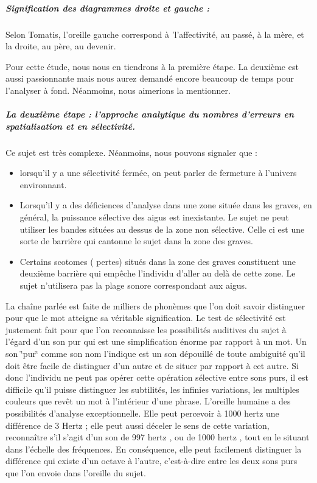 {\subparagraph{Signification des diagrammes droite et gauche : }

Selon Tomatis, l'oreille gauche correspond à \textquoteright l'affectivité,
au passé, à la mère, et la droite, au père, au devenir.

Pour cette étude, nous nous en tiendrons à la première étape. La deuxième est aussi passionnante mais nous aurez demandé encore beaucoup de temps pour l'analyser à fond. Néanmoins, nous aimerions la mentionner.

\subparagraph{La deuxième étape : l'approche analytique du nombres d'erreurs en
spatialisation et en sélectivité.}


Ce sujet est très complexe. Néanmoins, nous pouvons signaler que : 
\begin{itemize}
\item lorsqu'il y a une sélectivité fermée, on peut parler de fermeture
à l'univers environnant.
\item Lorsqu'il y a des déficiences d'analyse dans une zone située dans
les graves, en général, la puissance sélective des aigus est inexistante.
Le sujet ne peut utiliser les bandes situées au dessus de la zone
non sélective. Celle ci est une sorte de barrière qui cantonne le
sujet dans la zone des graves. 
\item Certains scotomes ( pertes) situés dans la zone des graves constituent
une deuxième barrière qui empêche l'individu d'aller au delà de cette
zone. Le sujet n'utilisera pas la plage sonore correspondant aux aigus. 
\end{itemize}

La chaîne parlée est faite de milliers de phonèmes que l'on doit savoir
distinguer pour que le mot atteigne sa véritable signification. Le
test de sélectivité est justement fait pour que l'on reconnaisse les
possibilités auditives du sujet à l\textquoteright égard d'un son
pur qui est une simplification énorme par rapport à un mot. Un son
\char`\"{}pur\char`\"{} comme son nom l'indique est un son dépouillé
de toute ambiguité qu'il doit être facile de distinguer d'un autre
et de situer par rapport à cet autre. Si donc l\textquoteright individu
ne peut pas opérer cette opération sélective entre sons purs, il est
difficile qu'il puisse distinguer les subtilités, les infinies variations,
les multiples couleurs que revêt un mot à l'intérieur d'une phrase.
L'oreille humaine a des possibilités d'analyse exceptionnelle. Elle
peut percevoir à 1000 hertz une différence de 3 Hertz ; elle peut
aussi déceler le sens de cette variation, reconnaître s'il s'agit
d'un son de 997 hertz , ou de 1000 hertz , tout en le situant dans
l\textquoteright échelle des fréquences. En conséquence, elle peut
facilement distinguer la différence qui existe d'un octave à l'autre,
c'est-à-dire entre les deux sons purs que l'on envoie dans l\textquoteright oreille
du sujet.

}
